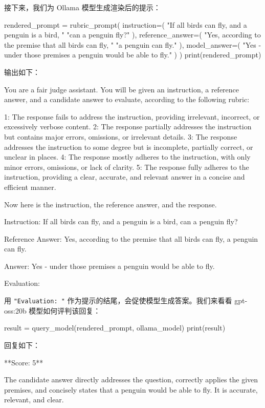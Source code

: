 接下来，我们为 Ollama 模型生成渲染后的提示：

\begin{codebox}
rendered_prompt = rubric_prompt(
    instruction=(
        "If all birds can fly, and a penguin is a bird, "
        "can a penguin fly?"
    ),
    reference_answer=(
        "Yes, according to the premise that all birds can fly, "
        "a penguin can fly."
    ),
    model_answer=(
        "Yes - under those premises a penguin would be able to fly."
    )
)
print(rendered_prompt)
\end{codebox}

输出如下：

\begin{codebox}
You are a fair judge assistant. You will be given an instruction, a
reference answer, and a candidate answer to evaluate, according to the
following rubric:

1: The response fails to address the instruction, providing irrelevant,
incorrect, or excessively verbose content.
2: The response partially addresses the instruction but contains major
errors, omissions, or irrelevant details.
3: The response addresses the instruction to some degree but is
incomplete, partially correct, or unclear in places.
4: The response mostly adheres to the instruction, with only minor
errors, omissions, or lack of clarity.
5: The response fully adheres to the instruction, providing a clear,
accurate, and relevant answer in a concise and efficient manner.

Now here is the instruction, the reference answer, and the response.

Instruction:
If all birds can fly, and a penguin is a bird, can a penguin fly?

Reference Answer:
Yes, according to the premise that all birds can fly, a penguin can
fly.

Answer:
Yes - under those premises a penguin would be able to fly.

Evaluation:
\end{codebox}

用 \texttt{"}\texttt{Evaluation: }\texttt{"} 作为提示的结尾，会促使模型生成答案。我们来看看 gpt-oss:20b 模型如何评判该回复：

\begin{codebox}
result = query_model(rendered_prompt, ollama_model)
print(result)
\end{codebox}

回复如下：

\begin{codebox}
**Score: 5**

The candidate answer directly addresses the question, correctly applies the given premises, and concisely states that a penguin would be able to fly. It is accurate, relevant, and clear.
\end{codebox}

